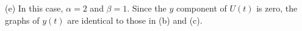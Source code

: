 \documentclass{ximera}
\begin{document}
\begin{computerExercise}
\begin{solution}
(e) In this case, $\alpha = 2$ and $\beta = 1$.  Since the $y$
component of $U(t)$ is zero, the graphs of $y(t)$ are identical
to those in (b) and (c).

\begin{figure}[htb]
                       \centerline{%
                       }
\end{figure}






\end{solution}
\end{computerExercise}
\end{document}
